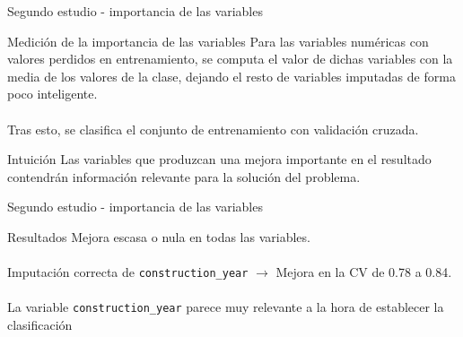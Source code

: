 \begin{frame}{Segundo estudio - importancia de las variables}
  \begin{block}{Medición de la importancia de las variables}
    Para las variables numéricas con valores perdidos en
    entrenamiento, se computa el valor de dichas variables con la
    media de los valores de la clase, dejando el resto de variables
    imputadas de forma poco inteligente.\\\\

    Tras esto, se clasifica el conjunto de entrenamiento con
    validación cruzada.
  \end{block}
  \begin{block}{Intuición}
    Las variables que produzcan una mejora importante en el resultado
    contendrán información relevante para la solución del problema.
  \end{block}
\end{frame}

\begin{frame}{Segundo estudio - importancia de las variables}
  \begin{block}{Resultados}
    Mejora escasa o nula en todas las variables.\\\\

    Imputación correcta de \texttt{construction\_year} $\rightarrow$
    Mejora en la CV de 0.78 a 0.84.\\\\

    La variable \texttt{construction\_year} parece muy relevante a
    la hora de establecer la clasificación
  \end{block}
\end{frame}
